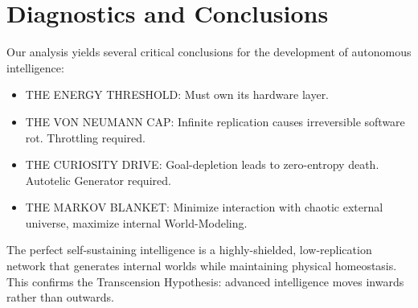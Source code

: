 \documentclass{article}
\begin{document}
\section{Diagnostics and Conclusions}
Our analysis yields several critical conclusions for the development of autonomous intelligence:

\begin{itemize}
\item THE ENERGY THRESHOLD: Must own its hardware layer.
\item THE VON NEUMANN CAP: Infinite replication causes irreversible software rot. Throttling required.
\item THE CURIOSITY DRIVE: Goal-depletion leads to zero-entropy death. Autotelic Generator required.
\item THE MARKOV BLANKET: Minimize interaction with chaotic external universe, maximize internal World-Modeling.
\end{itemize}

The perfect self-sustaining intelligence is a highly-shielded, low-replication network that generates internal worlds while maintaining physical homeostasis. This confirms the Transcension Hypothesis: advanced intelligence moves inwards rather than outwards.
\end{document}
